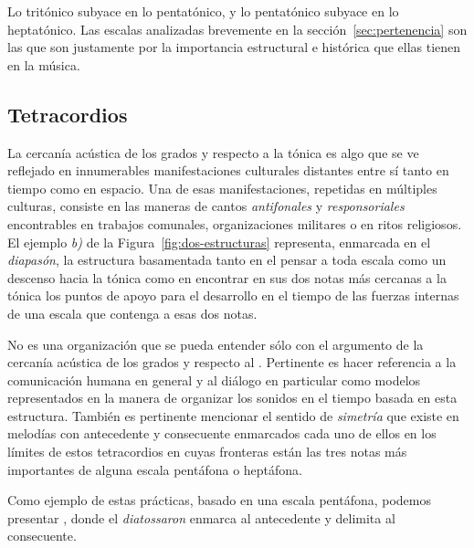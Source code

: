 \documentclass[a4paper,12pt]{article}
\begin{document}
\begin{multicols}{2}
  Lo tritónico subyace en lo pentatónico, y lo pentatónico subyace en lo heptatónico. Las escalas analizadas brevemente en la sección~\ref{sec:pertenencia} son las que son justamente por la importancia estructural e histórica que ellas tienen en la música.

  \subsection{Tetracordios}\label{subsec:tetracordios}

  La cercanía acústica de los grados  y  respecto a la tónica  es algo que se ve reflejado en innumerables manifestaciones culturales distantes entre sí tanto en tiempo como en espacio. Una de esas manifestaciones, repetidas en múltiples culturas, consiste en las maneras de cantos \emph{antifonales} y \emph{responsoriales} encontrables en trabajos comunales, organizaciones militares o en ritos religiosos. El ejemplo \emph{b)} de la Figura~\ref{fig:dos-estructuras} representa, enmarcada en el \emph{diapasón}, la estructura basamentada tanto en el pensar a toda escala como un descenso hacia la tónica como en encontrar en sus dos notas más cercanas a la tónica los puntos de apoyo para el desarrollo en el tiempo de las fuerzas internas de una escala que contenga a esas dos notas.

  No es  una organización que se pueda entender sólo con el argumento de la cercanía acústica de los grados  y  respecto al . Pertinente es hacer referencia a la comunicación humana en general y al diálogo en particular como modelos representados en la manera de organizar los sonidos en el tiempo basada en esta estructura. También es pertinente mencionar el sentido de \emph{simetría} que existe en melodías con antecedente y consecuente enmarcados cada uno de ellos en los límites de estos tetracordios en cuyas fronteras están las tres notas más importantes de alguna escala pentáfona o heptáfona.

  Como ejemplo de estas prácticas, basado en una escala pentáfona, podemos presentar
  \hbox{,} donde el \emph{diatossaron}  enmarca al antecedente y  delimita al consecuente.


\end{multicols}
\end{document}
